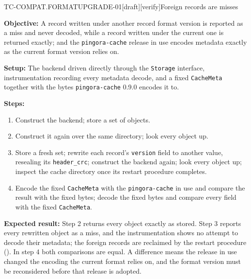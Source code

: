 \begin{requirement}{TC-COMPAT.FORMATUPGRADE-01}[draft][verify]{Foreign records are misses}


  \textbf{Objective:} A record written under another record format version is
  reported as a miss and never decoded, while a record written under the
  current one is returned exactly; and the \texttt{pingora-cache} release in
  use encodes metadata exactly as the current format version relies on.

  \textbf{Setup:} The backend driven directly through the \texttt{Storage}
  interface, instrumentation recording every metadata decode, and a fixed
  \texttt{CacheMeta} together with the bytes \texttt{pingora-cache} 0.9.0
  encodes it to.

  \textbf{Steps:}
  \begin{enumerate}
    \item Construct the backend; store a set of objects.
    \item Construct it again over the same directory; look every object up.
    \item Store a fresh set; rewrite each record's \texttt{version} field to
      another value, resealing its \texttt{header\_crc}; construct the backend
      again; look every object up; inspect the cache directory once its
      restart procedure completes.
    \item Encode the fixed \texttt{CacheMeta} with the \texttt{pingora-cache}
      in use and compare the result with the fixed bytes; decode the fixed
      bytes and compare every field with the fixed \texttt{CacheMeta}.
  \end{enumerate}

  \textbf{Expected result:} Step 2 returns every object exactly as stored.
  Step 3 reports every rewritten object as a miss, and the instrumentation
  shows no attempt to decode their metadata; the foreign records are
  reclaimed by the restart procedure (). In
  step 4 both comparisons are equal. A difference means the release in use
  changed the encoding the current format relies on, and the format version
  must be reconsidered before that release is adopted.



\end{requirement}

